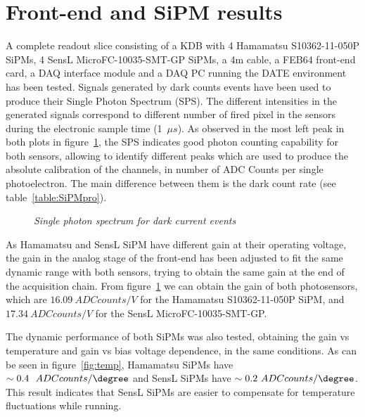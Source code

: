 \section{Front-end and SiPM results}\label{sec:results}
A complete readout slice consisting of a KDB with 4 Hamamatsu S10362-11-050P SiPMs, 4 SensL MicroFC-10035-SMT-GP SiPMs, a 4m cable, a FEB64 front-end card, a DAQ interface module and a DAQ PC running the DATE environment has been tested.
Signals generated by dark counts events have been used to produce their Single Photon Spectrum (SPS). The different intensities in the generated signals correspond to different number of fired pixel in the sensors during the electronic sample time (1~$\mu s$). As observed in the most left peak in both plots in figure~\ref{fig:dk}, the SPS indicates good photon counting capability for both sensors, allowing to identify different peaks which are used to produce the absolute calibration of the channels, in number of ADC Counts per single photoelectron. The main difference between them is the dark count rate (see table~\ref{table:SiPMpro}).

\begin{figure}[h!]
  \centering
  \hspace{5mm}             
  \caption{\textit{Single photon spectrum for dark current events}}
  \label{fig:dk}
\end{figure}

As Hamamatsu and SensL SiPM have different gain at their operating voltage, the gain in the analog stage of the front-end has been adjusted to fit the same dynamic range with both sensors, trying to obtain the same gain at the end of the acquisition chain. From figure~\ref{fig:dk} we can obtain the gain of both photosensors, which are $16.09~ADC counts/V$ for the Hamamatsu S10362-11-050P SiPM, and $17.34~ADC counts/V$ for the SensL MicroFC-10035-SMT-GP.

The dynamic performance of both SiPMs was also tested, obtaining the gain vs temperature and gain vs bias voltage dependence, in the same conditions. As can be seen in figure~\ref{fig:temp}, Hamamatsu SiPMs have $\sim0.4~~ADC counts/\degree$ and SensL SiPMs have $\sim0.2~ADC counts/\degree$. This result indicates that SensL SiPMs are easier to compensate for temperature fluctuations while running.


